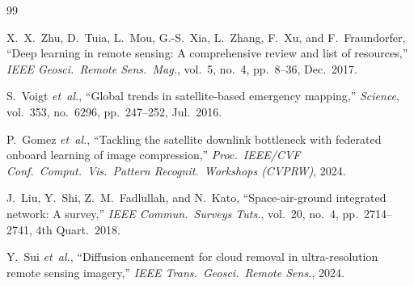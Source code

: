 \documentclass[conference]{IEEEtran}
\begin{document}
\begin{thebibliography}{99}

X.~X.~Zhu, D.~Tuia, L.~Mou, G.-S.~Xia, L.~Zhang, F.~Xu, and
F.~Fraundorfer,
``Deep learning in remote sensing: A comprehensive review and list of
resources,''
\emph{IEEE Geosci.\ Remote Sens.\ Mag.}, vol.~5, no.~4, pp.~8--36,
Dec.\ 2017.

S.~Voigt \emph{et~al.},
``Global trends in satellite-based emergency mapping,''
\emph{Science}, vol.~353, no.~6296, pp.~247--252, Jul.\ 2016.

P.~Gomez \emph{et~al.},
``Tackling the satellite downlink bottleneck with federated onboard
learning of image compression,''
\emph{Proc.\ IEEE/CVF Conf.\ Comput.\ Vis.\ Pattern Recognit.\
Workshops (CVPRW)}, 2024.

J.~Liu, Y.~Shi, Z.~M.~Fadlullah, and N.~Kato,
``Space-air-ground integrated network: A survey,''
\emph{IEEE Commun.\ Surveys Tuts.}, vol.~20, no.~4, pp.~2714--2741,
4th Quart.\ 2018.

Y.~Sui \emph{et~al.},
``Diffusion enhancement for cloud removal in ultra-resolution remote
sensing imagery,''
\emph{IEEE Trans.\ Geosci.\ Remote Sens.}, 2024.


\end{thebibliography}
\end{document}
